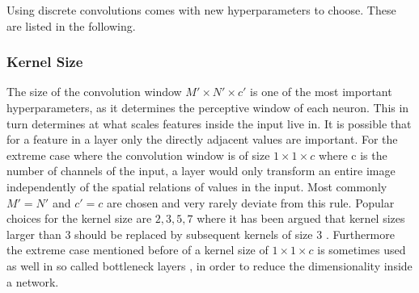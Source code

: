 Using discrete convolutions comes with new hyperparameters to choose. These are listed in the following.

\subsubsection{Kernel Size}
The size of the convolution window $M' \times N' \times c'$ is one of the most important hyperparameters, as it determines the perceptive window of each neuron. This in turn determines at what scales features inside the input live in. It is possible that for a feature in a layer only the directly adjacent values are important. For the extreme case where the convolution window is of size $1\times 1 \times c$ where c is the number of channels of the input, a layer would only transform an entire image independently of the spatial relations of values in the input. Most commonly $M'=N'$ and $c'=c$ are chosen and very rarely deviate from this rule. Popular choices for the kernel size are $2,3,5,7$ where it has been argued that kernel sizes larger than $3$ should be replaced by subsequent kernels of size $3$ \cite{Szegedy2015}. Furthermore the extreme case mentioned before of a kernel size of $1\times 1 \times c$ is sometimes used as well in so called bottleneck layers \cite{Lin2013}, in order to reduce the dimensionality inside a network. 


 
